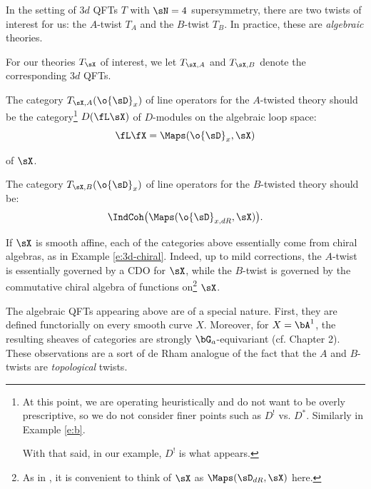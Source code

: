 In the setting of $3d$ QFTs $T$ with $\sN = 4$ supersymmetry,
there are two twists of interest for us: the $A$-twist $T_A$ and
the $B$-twist $T_B$. In practice, these are \emph{algebraic} theories.

For our theories $T_{\sX}$ of interest,
we let $T_{\sX,A}$ and $T_{\sX,B}$ denote the corresponding
$3d$ QFTs.

\begin{example}
\notready

The category $T_{\sX,A}(\o{\sD}_x)$ of line operators for the $A$-twisted theory
should be the category\footnote{At this point,
we are operating heuristically and do not want to be overly prescriptive, so
we do not consider finer points such as $D^!$ vs. $D^*$. Similarly in
Example \ref{e:b}.

With that said, in our example, $D^!$ is what appears.}
$D(\fL\sX)$ of $D$-modules on the algebraic loop space:
%
\[
\fL \fX = \Maps(\o{\sD}_x,\sX)
\]

 of $\sX$.

\end{example}

\begin{example}
\notready\label{e:b}

The category $T_{\sX,B}(\o{\sD}_x)$ of line operators for the $B$-twisted
theory should be:
%
\[
\IndCoh\big(\Maps(\o{\sD}_{x,dR},\sX)\big).
\]

\end{example}

\begin{rem}
\notready

If $\sX$ is smooth affine, each of the categories above essentially
come from chiral algebras, as in Example \ref{e:3d-chiral}.
Indeed, up to mild corrections,
the $A$-twist is essentially governed by a CDO for $\sX$, while the
$B$-twist is governed by the commutative chiral algebra of functions
on\footnote{As in \cite{chiral}, it is convenient to think of
$\sX$ as $\Maps(\sD_{dR},\sX)$ here.} $\sX$.

\end{rem}

\begin{rem}
\notready

The algebraic QFTs appearing above are of a special nature. First, they
are defined functorially on every smooth curve $X$. Moreover, for
$X = \bA^1$, the resulting sheaves of categories are strongly
$\bG_a$-equivariant (cf. \cite{butson-thesis-i} Chapter 2).
These observations are a sort of de Rham analogue of the
fact that the $A$ and $B$-twists are \emph{topological} twists.

\end{rem}

